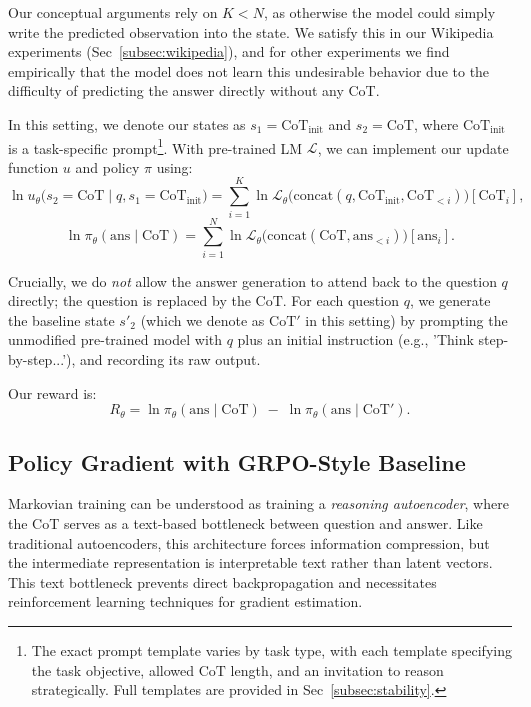 \documentclass{article} %
\begin{document}
Our conceptual arguments rely on $K < N$, as otherwise the model could simply write the predicted observation into the state. We satisfy this in our Wikipedia experiments (Sec~\ref{subsec:wikipedia}), and for other experiments we find empirically that the model does not learn this undesirable behavior due to the difficulty of predicting the answer directly without any CoT.

In this setting, we denote our states as $s_1 = \text{CoT}_{\text{init}}$ and $s_2 = \text{CoT}$, where $\text{CoT}_{\text{init}}$ is a task-specific prompt\footnote{The exact prompt template varies by task type, with each template specifying the task objective, allowed $\text{CoT}$ length, and an invitation to reason strategically. Full templates are provided in Sec~\ref{subsec:stability}.}. With pre-trained LM $\mathcal{L}$, we can implement our update function $u$ and policy $\pi$ using:
\[\ln u_\theta\!\bigl(s_2=\text{CoT}\mid q, s_1=\text{CoT}_{\text{init}}\bigr)
= \sum_{i=1}^{K} \ln \mathcal{L}_\theta\!\bigl(\text{concat}(q,\text{CoT}_{\text{init}},\text{CoT}_{<i})\bigr)[\text{CoT}_i], \]
\[\ln \pi_\theta(\text{ans}\mid \text{CoT})
= \sum_{i=1}^{N} \ln \mathcal{L}_\theta\!\bigl(\text{concat}(\text{CoT},\text{ans}_{<i})\bigr)[\text{ans}_i].\]

Crucially, we do \emph{not} allow the answer generation to attend back to the question $q$ directly; the question is replaced by the $\text{CoT}$. For each question $q$, we generate the baseline state $s'_2$ (which we denote as $\text{CoT}'$ in this setting) by prompting the unmodified pre-trained model with $q$ plus an initial instruction (e.g., 'Think step-by-step...'), and recording its raw output.

Our reward is:
$$
R_\theta = \ln \pi_\theta(\text{ans} \mid \text{CoT}) \;-\; \ln \pi_\theta(\text{ans} \mid \text{CoT}').
$$

\subsection{Policy Gradient with GRPO-Style Baseline}
\label{subsec:grpo}

Markovian training can be understood as training a \emph{reasoning autoencoder}, where the CoT serves as a text-based bottleneck between question and answer. Like traditional autoencoders, this architecture forces information compression, but the intermediate representation is interpretable text rather than latent vectors. This text bottleneck prevents direct backpropagation and necessitates reinforcement learning techniques for gradient estimation.
\end{document}
